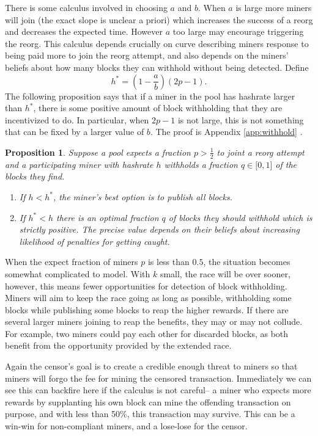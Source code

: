\documentclass{article}%
\newtheorem{proposition}[theorem]{Proposition}
\begin{document}
There is some calculus involved in choosing $a$ and $b.$  When $a$ is large more
miners will join (the exact slope is unclear a priori) which increases the
success of a reorg and decreases the expected time. 
 However $a$ too large may encourage triggering the reorg.  This calculus depends crucially on curve describing miners response to being
paid more to join the reorg attempt, and also depends on the miners' beliefs about how many blocks they can withhold without being detected.
Define 
\[
h^{\ast}=\left(  1-\frac{a}{b}\right)  (2p-1).
\]
The following proposition says that if a miner in the pool has hashrate larger than $h^{\ast}$, there is some positive amount of block withholding that they are incentivized to do.  In particular, when $2p-1$ is not large, this is not something that can be fixed by a larger value of $b$.  The proof is Appendix \ref{app:withhold} .

\begin{proposition}
\label{prop:withhold_maintext}Suppose a pool expects a fraction $p>\frac{1}{2}$ to joint a reorg attempt and a participating
miner with hashrate $h$ withholds a fraction $q\in\lbrack0,1]$ of the blocks
they find.

\begin{enumerate}
\item If $h<h^{\ast}$, the miner's best option is to publish all blocks.  

\item If $h^{\ast}<h $ there is an optimal fraction $q$ of blocks they should withhold which is strictly positive.  The precise value depends on their beliefs about increasing likelihood of penalties for getting caught.  

\end{enumerate}
\end{proposition}

When the expect fraction of miners  $p$ is less than $0.5$, the situation becomes somewhat complicated to model. With $k$
small, the race will be over sooner, however, this means fewer opportunities
for detection of block withholding.  Miners will aim to keep the race going
as long as possible, withholding some blocks while publishing some blocks to
reap the higher rewards.  If there are several larger miners joining to
reap the benefits, they may or may not collude.  For example, two miners
could pay each other for discarded blocks, as both benefit from the
opportunity provided by the extended race.

Again the censor's goal is to create a credible enough threat to miners so that miners
will forgo the fee for mining the censored transaction.  Immediately we can
see this can backfire here if the calculus is not careful-- a miner who
expects more rewards by supplanting his own block can mine the offending
transaction on purpose, and with less than 50\%, this transaction may survive.
 This can be a win-win for non-compliant miners, and a lose-lose for the censor.
\end{document}
